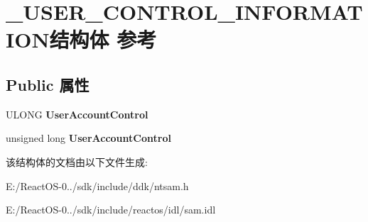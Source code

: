 \hypertarget{struct___u_s_e_r___c_o_n_t_r_o_l___i_n_f_o_r_m_a_t_i_o_n}{}\section{\+\_\+\+U\+S\+E\+R\+\_\+\+C\+O\+N\+T\+R\+O\+L\+\_\+\+I\+N\+F\+O\+R\+M\+A\+T\+I\+O\+N结构体 参考}
\label{struct___u_s_e_r___c_o_n_t_r_o_l___i_n_f_o_r_m_a_t_i_o_n}
\subsection*{Public 属性}
\begin{DoxyCompactItemize}
\item 
\mbox{\label{struct___u_s_e_r___c_o_n_t_r_o_l___i_n_f_o_r_m_a_t_i_o_n_aecbb6360cdeddb6d26e0b521559e4f2f}} 
U\+L\+O\+NG {\bfseries User\+Account\+Control}
\item 
\mbox{\label{struct___u_s_e_r___c_o_n_t_r_o_l___i_n_f_o_r_m_a_t_i_o_n_aa2feefe60a2da8ca04962d75b942ced3}} 
unsigned long {\bfseries User\+Account\+Control}
\end{DoxyCompactItemize}


该结构体的文档由以下文件生成\+:\begin{DoxyCompactItemize}
\item 
E\+:/\+React\+O\+S-\/0../sdk/include/ddk/ntsam.\+h\item 
E\+:/\+React\+O\+S-\/0../sdk/include/reactos/idl/sam.\+idl\end{DoxyCompactItemize}

